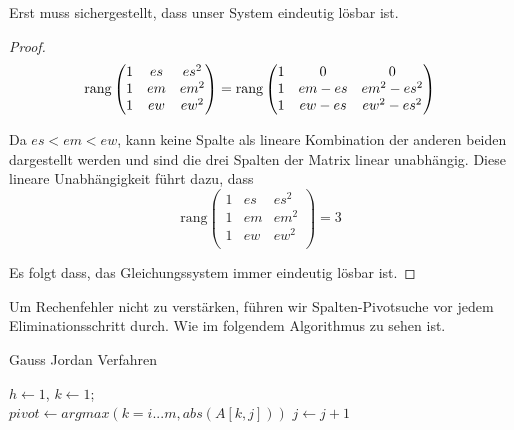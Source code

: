 \documentclass[course=erap]{aspdoc}
\begin{document}
Erst muss sichergestellt, dass unser System eindeutig lösbar ist.

\begin{proof}
\[
\text{rang}\left(\begin{matrix}1 & es & es^2  \\
1 & em & em^2 \\
1 & ew & ew^2  \\
\end{matrix}\right)
=
\text{rang}\left(\begin{matrix}1 & 0 & 0 \\ 1 & em-es & em^2-es^2 \\ 1 & ew-es & ew^2-es^2\end{matrix}\right) 
\\
\] 

Da $es < em < ew$, kann keine Spalte als lineare Kombination der anderen beiden dargestellt werden und sind die drei Spalten der Matrix linear unabhängig. Diese lineare Unabhängigkeit führt dazu, dass 
\[\text{rang}\left(\begin{matrix}1 & es & es^2  \\
1 & em & em^2  \\
1 & ew & ew^2 \\
\end{matrix}\right)
=
3 \]

Es folgt dass, das Gleichungssystem immer eindeutig lösbar ist.
\end{proof}

Um Rechenfehler nicht zu verstärken, führen wir Spalten-Pivotsuche vor jedem Eliminationsschritt durch.
Wie im folgendem Algorithmus zu sehen ist.

\begin{algorithm}[H]
\caption{Gauss Jordan Verfahren}
$h \leftarrow 1$,
$k \leftarrow 1$; \\
 {
$pivot \leftarrow argmax (k = i ... m, abs(A[k, j]))$ 
   {
        $j \leftarrow j + 1$ 
  }
}
\end{algorithm}
\end{document}
